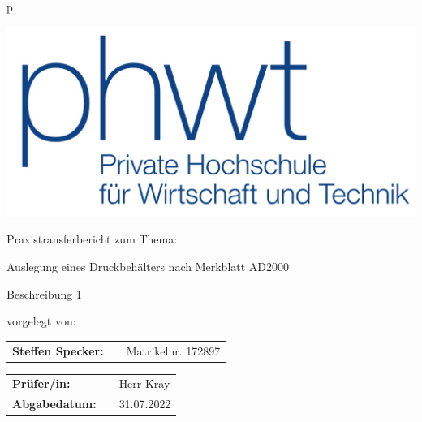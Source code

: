 \thispagestyle{empty}
\begin{tabular}{p{\textwidth}}

\vspace{1cm}

\begin{center}
\includegraphics[scale=1]{img/PHWT-Logo.jpg}\\
\end{center}

\vspace{0.5cm}

\begin{center}
\large{Praxistransferbericht zum Thema:\\}
\end{center}

\begin{center}
\Large{Auslegung eines Druckbehälters nach Merkblatt AD2000}
\end{center}

\vspace{0cm}

\begin{center}
Beschreibung 1\\
\end{center} 

\vspace{0.2cm}

\begin{center}
vorgelegt von: 
\end{center}

\begin{center}
    \begin{tabular}{lll}
        \textbf{Steffen Specker:} & & Matrikelnr. 172897
        \end{tabular} 
\end{center}

\vspace{0.2cm}

\begin{center}
\begin{tabular}{lll}
\textbf{Prüfer/in:} & & Herr Kray\\
\textbf{Abgabedatum:} & & 31.07.2022\\
\end{tabular}
\end{center}

\end{tabular}